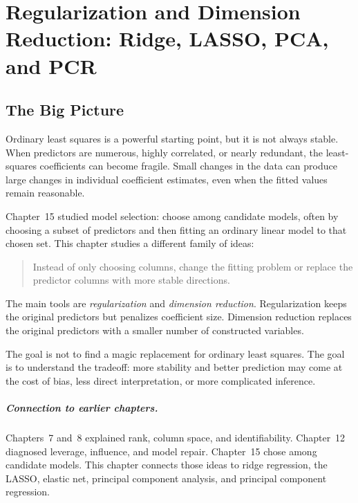 \chapter[Regularization and Dimension Reduction]{Regularization and Dimension Reduction: Ridge, LASSO, PCA, and PCR}
\label{chap:regularization-dimension-reduction-ridge-lasso-pca-pcr}

\section{The Big Picture}

Ordinary least squares is a powerful starting point, but it is not always stable.  When predictors are numerous, highly correlated, or nearly redundant, the least-squares coefficients can become fragile.  Small changes in the data can produce large changes in individual coefficient estimates, even when the fitted values remain reasonable.

Chapter~15 studied model selection: choose among candidate models, often by choosing a subset of predictors and then fitting an ordinary linear model to that chosen set.  This chapter studies a different family of ideas:
\begin{quote}
  Instead of only choosing columns, change the fitting problem or replace the predictor columns with more stable directions.
\end{quote}

The main tools are \emph{regularization} and \emph{dimension reduction}.  Regularization keeps the original predictors but penalizes coefficient size.  Dimension reduction replaces the original predictors with a smaller number of constructed variables.

The goal is not to find a magic replacement for ordinary least squares.  The goal is to understand the tradeoff: more stability and better prediction may come at the cost of bias, less direct interpretation, or more complicated inference.

\paragraph{Connection to earlier chapters.}
Chapters~7 and~8 explained rank, column space, and identifiability.  Chapter~12 diagnosed leverage, influence, and model repair.  Chapter~15 chose among candidate models.  This chapter connects those ideas to ridge regression, the LASSO, elastic net, principal component analysis, and principal component regression.

